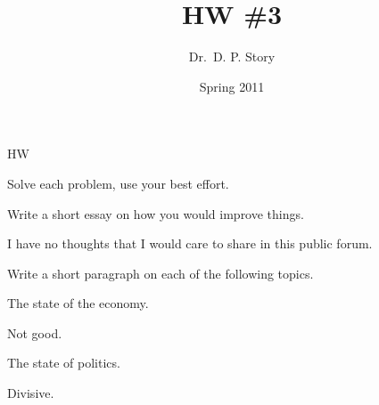 \documentclass{article}
\title[HW3]{HW \#3}
\author{Dr.\ D. P. Story}
\date{Spring 2011}
\begin{document}
\maketitle

\begin{exam}{HW}

\begin{instructions}[]
Solve each problem, use your best effort.
\end{instructions}

\begin{problem}
Write a short essay on how you would improve things.
\begin{solution}[2in]
I have no thoughts that I would care to share in this public forum.
\end{solution}
\end{problem}

\fillTypeDefault

\begin{problem*}
Write a short paragraph on each of the following topics.
\begin{parts}
    \item The state of the economy.
\begin{solution}[1in]
Not good.
\end{solution}

\fillTypeDashLine

    \item The state of politics.
\begin{solution}[3in]
Divisive.
\end{solution}
\end{parts}
\end{problem*}

\end{exam}
\end{document}
